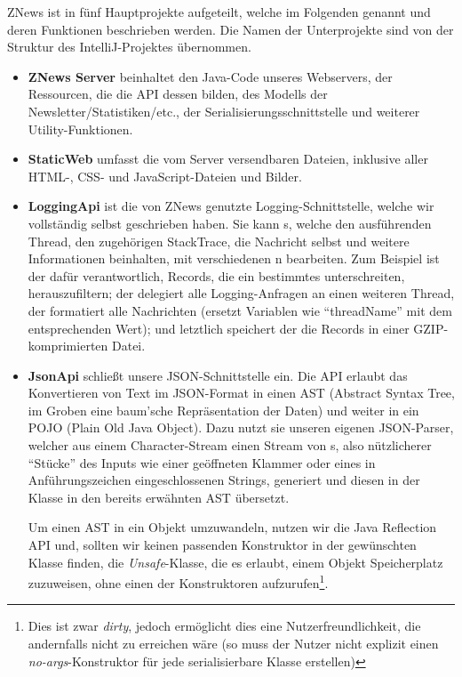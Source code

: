 ZNews ist in fünf Hauptprojekte aufgeteilt,
welche im Folgenden genannt und deren Funktionen beschrieben werden.
Die Namen der Unterprojekte sind von der Struktur des IntelliJ-Projektes übernommen.

\begin{itemize}
    \item \textbf{ZNews Server}
    beinhaltet den Java-Code unseres Webservers,
    der Ressourcen, die die API dessen bilden,
    des Modells der Newsletter/Statistiken/etc.,
    der Serialisierungsschnittstelle
    und weiterer Utility-Funktionen.

    \item \textbf{StaticWeb}
    umfasst die vom Server versendbaren Dateien,
    inklusive aller HTML-, CSS- und JavaScript-Dateien und Bilder.

    \item \textbf{LoggingApi}
    ist die von ZNews genutzte Logging-Schnittstelle,
    welche wir vollständig selbst geschrieben haben.
    Sie kann s,
    welche den ausführenden Thread, den zugehörigen StackTrace,
    die Nachricht selbst und weitere Informationen beinhalten,
    mit verschiedenen n bearbeiten.
    Zum Beispiel ist der  dafür verantwortlich,
    Records, die ein bestimmtes  unterschreiten,
    herauszufiltern;
    der  delegiert alle Logging-Anfragen an einen weiteren Thread,
    der  formatiert alle Nachrichten
    (ersetzt Variablen wie ``{threadName}'' mit dem entsprechenden Wert);
    und letztlich speichert der  die Records in einer GZIP-komprimierten Datei.

    \item \textbf{JsonApi}
    schließt unsere JSON-Schnittstelle ein.
    Die API erlaubt das Konvertieren von Text im JSON-Format
    in einen AST (Abstract Syntax Tree, im Groben eine baum'sche Repräsentation der Daten)
    und weiter in ein POJO (Plain Old Java Object).
    Dazu nutzt sie unseren eigenen JSON-Parser,
    welcher aus einem Character-Stream einen Stream von s,
    also nützlicherer ``Stücke'' des Inputs
    wie einer geöffneten Klammer oder eines in Anführungszeichen eingeschlossenen Strings,
    generiert
    und diesen in der Klasse  in den bereits erwähnten AST übersetzt.

    Um einen AST in ein Objekt umzuwandeln,
    nutzen wir die Java Reflection API
    und, sollten wir keinen passenden Konstruktor in der gewünschten Klasse finden,
    die \emph{Unsafe}-Klasse, die es erlaubt,
    einem Objekt Speicherplatz zuzuweisen,
    ohne einen der Konstruktoren aufzurufen\footnote{%
    Dies ist zwar \emph{dirty},
    jedoch ermöglicht dies eine Nutzerfreundlichkeit,
    die andernfalls nicht zu erreichen wäre
    (so muss der Nutzer nicht explizit einen \emph{no-args}-Konstruktor für jede serialisierbare Klasse erstellen)}.


\end{itemize}
